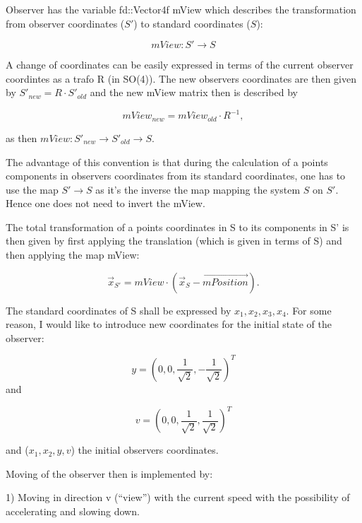 \documentclass[titlepage]{scrartcl}
\begin{document}
Observer has the variable fd::Vector4f mView which describes the transformation from observer coordinates ($S'$) to standard coordinates ($S$):

\begin{equation}
mView: S' \to S
\end{equation}

A change of coordinates can be easily expressed in terms of the current observer coordintes as a trafo R (in SO(4)). The new observers coordinates are then given by $S'_{new} = R \cdot S'_{old}$ and the new mView matrix then is described by 

\begin{equation}
mView_{new} = mView_{old} \cdot R^{-1},
\end{equation}

as then $mView : S'_{new} \to S'_{old} \to S$.

The advantage of this convention is that during the calculation of a points components in observers coordinates from its standard coordinates, one has to use the map $S' \to S$ as it's the inverse the map mapping the system $S$ on $S'$. Hence one does not need to invert the mView.

The total transformation of a points coordinates in S to its components in S' is then given by first applying the translation (which is given in terms of S) and then applying the map mView:

\begin{equation}
\vec{x}_{S'} = mView \cdot (\vec{x}_S - \vec{mPosition}).
\end{equation}

The standard coordinates of S shall be expressed by $x_1, x_2, x_3, x_4$. For some reason, I would like to introduce new coordinates for the initial state of the observer: 

\begin{equation}
y = (0, 0, \frac{1}{\sqrt{2}}, -\frac{1}{\sqrt{2}})^T
\end{equation} and

\begin{equation}
v = (0, 0, \frac{1}{\sqrt{2}}, \frac{1}{\sqrt{2}})^T
\end{equation}

and ($x_1, x_2, y, v$) the initial observers coordinates. 

Moving of the observer then is implemented by: 

1) Moving in direction v (\enquote{view}) with the current speed with the possibility of accelerating and slowing down. 
\end{document}
